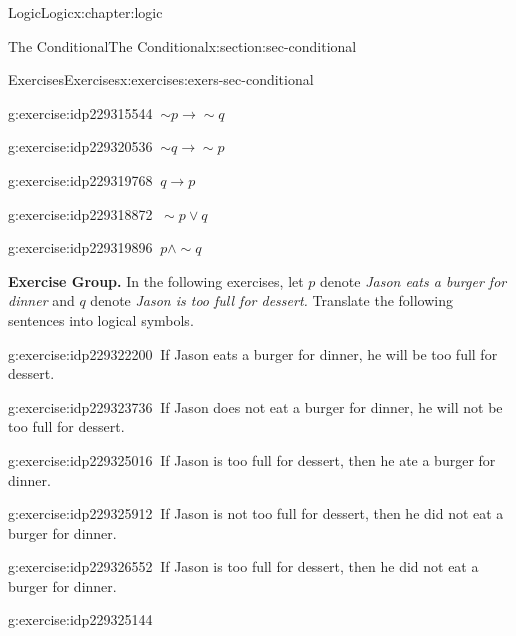 \documentclass[twoside,10pt,]{book}
\numberwithin{equation}{section}
\newcommand{\inverse}{{\sim\!{p}{} {\rightarrow} \sim\!{q}{}}}
\newcommand{\converse}{{q {\rightarrow} p}}
\newcommand{\contrapositive}{{\sim\!{q}{} {\rightarrow} \sim\!{p}{}}}
\begin{document}
\begin{chapterptx}{Logic}{}{Logic}{}{}{x:chapter:logic}
\begin{sectionptx}{The Conditional}{}{The Conditional}{}{}{x:section:sec-conditional}
\begin{exercises-subsection}{Exercises}{}{Exercises}{}{}{x:exercises:exers-sec-conditional}
\begin{exercisegroup}
\begin{divisionexerciseeg}{2}{}{}{g:exercise:idp229315544}
\(\ \inverse\)\end{divisionexerciseeg}%
\begin{divisionexerciseeg}{3}{}{}{g:exercise:idp229320536}%
\(\ \contrapositive\)\end{divisionexerciseeg}%
\begin{divisionexerciseeg}{4}{}{}{g:exercise:idp229319768}%
\(\ \converse\)\end{divisionexerciseeg}%
\begin{divisionexerciseeg}{5}{}{}{g:exercise:idp229318872}%
\(\ \sim\!{p}{\vee} q\)\end{divisionexerciseeg}%
\begin{divisionexerciseeg}{6}{}{}{g:exercise:idp229319896}%
\(\ p{\wedge}\sim\!{q}\)\end{divisionexerciseeg}%
\end{exercisegroup}
\par\medskip\noindent
\par\medskip\noindent%
\textbf{Exercise Group.}\space\space%
In the following exercises, let \(p\) denote \emph{Jason eats a burger for dinner} and \(q\) denote \emph{Jason is too full for dessert.}  Translate the following sentences into logical symbols.\begin{exercisegroup}
\begin{divisionexerciseeg}{7}{}{}{g:exercise:idp229322200}%
\(\ \)If Jason eats a burger for dinner, he will be too full for dessert.\end{divisionexerciseeg}%
\begin{divisionexerciseeg}{8}{}{}{g:exercise:idp229323736}%
\(\ \)If Jason does not eat a burger for dinner, he will not be too full for dessert.\end{divisionexerciseeg}%
\begin{divisionexerciseeg}{9}{}{}{g:exercise:idp229325016}%
\(\ \)If Jason is too full for dessert, then he ate a burger for dinner.\end{divisionexerciseeg}%
\begin{divisionexerciseeg}{10}{}{}{g:exercise:idp229325912}%
\(\ \)If Jason is not too full for dessert, then he did not eat a burger for dinner.\end{divisionexerciseeg}%
\begin{divisionexerciseeg}{11}{}{}{g:exercise:idp229326552}%
\(\ \)If Jason is too full for dessert, then he did not eat a burger for dinner.\end{divisionexerciseeg}%
\begin{divisionexerciseeg}{12}{}{}{g:exercise:idp229325144}%

\end{divisionexerciseeg}
\end{exercisegroup}
\end{exercises-subsection}
\end{sectionptx}
\end{chapterptx}
\end{document}
